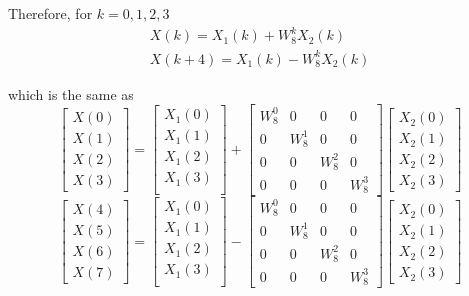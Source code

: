 \documentclass[journal,12pt,twocolumn]{IEEEtran}
\numberwithin{equation}{section}
\renewcommand\thesection{\arabic{section}}
\renewcommand\thesection{\arabic{section}}
\begin{document}
\begin{enumerate}[label=\arabic*.,ref=\thesection.\theenumi]
    Therefore, for $k=0,1,2,3$
    \begin{align}
    		X(k) = X_1(k) + W_8^k X_2(k)  \\
    		X(k+4) = X_1(k) - W_8^k X_2(k) 
    \end{align}
    
    which is the same as
    \begin{equation}
\begin{bmatrix}
X(0) \\ 
X(1) \\ 
X(2) \\ 
X(3)
\end{bmatrix}
=
\begin{bmatrix}
X_{1}(0) \\ 
X_{1}(1)\\ 
X_{1}(2)\\
X_{1}(3)\\
\end{bmatrix}
+
\begin{bmatrix}
W^{0}_{8} & 0 & 0 & 0\\
0 & W^{1}_{8} & 0 & 0\\
0 & 0 & W^{2}_{8} & 0\\
0 & 0 & 0 & W^{3}_{8}
\end{bmatrix}
\begin{bmatrix}
X_{2}(0) \\ 
X_{2}(1) \\ 
X_{2}(2) \\
X_{2}(3)
\end{bmatrix}
\end{equation}
\begin{equation}
\begin{bmatrix}
X(4) \\ 
X(5) \\ 
X(6) \\ 
X(7)
\end{bmatrix}
=
\begin{bmatrix}
X_{1}(0) \\ 
X_{1}(1)\\ 
X_{1}(2)\\
X_{1}(3)\\
\end{bmatrix}
-
\begin{bmatrix}
W^{0}_{8} & 0 & 0 & 0\\
0 & W^{1}_{8} & 0 & 0\\
0 & 0 & W^{2}_{8} & 0\\
0 & 0 & 0 & W^{3}_{8}
\end{bmatrix}
\begin{bmatrix}
X_{2}(0) \\ 
X_{2}(1) \\ 
X_{2}(2) \\
X_{2}(3)
\end{bmatrix}
\end{equation}


\end{enumerate}
\end{document}
